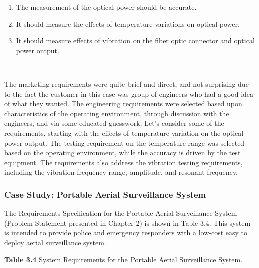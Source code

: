 \begin{longtable}[]
{\begin{minipage}[t]{\linewidth}
\begin{enumerate}
\def\labelenumi{\arabic{enumi}.}
\item
  The measurement of the optical power should be accurate.
\item
  It should measure the effects of temperature variations on optical
  power.
\item
  It should measure effects of vibration on the fiber optic connector
  and optical power output.
\end{enumerate}
\end{minipage}} \\
\end{longtable}

The marketing requirements were quite brief and direct, and not
surprising due to the fact the customer in this case was group of
engineers who had a good idea of what they wanted. The engineering
requirements were selected based upon characteristics of the operating
environment, through discussion with the engineers, and via some
educated guesswork. Let's consider some of the requirements, starting
with the effects of temperature variation on the optical power output.
The testing requirement on the temperature range was selected based on
the operating environment, while the accuracy is driven by the test
equipment. The requirements also address the vibration testing
requirements, including the vibration frequency range, amplitude, and
resonant frequency.

\subsubsection{Case Study: Portable Aerial Surveillance
System}\label{case-study-portable-aerial-surveillance-system}

The Requirements Specification for the Portable Aerial Surveillance
System (Problem Statement presented in Chapter 2) is shown in Table 3.4.
This system is intended to provide police and emergency responders with
a low-cost easy to deploy aerial surveillance system.

\textbf{Table 3.4} System Requirements for the Portable Aerial
Surveillance System.

